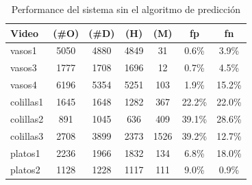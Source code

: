 \begin{table}[htb]
  \begin{tabular}{|l | c | c | c | c | c | c |}
	\hline  
	\textbf{Video} & \textbf{(\#O)} &  \textbf{(\#D)} & \textbf{(H)} & 
	\textbf{(M)} & \textbf{fp} & \textbf{fn}\\
	\hline
	\hline
	vasos1 & 5050 & 4880 & 4849 & 31 & 0.6\% & 3.9\% \\
	vasos3 & 1777 & 1708 & 1696 & 12 & 0.7\% & 4.5\% \\	
	vasos4 & 6196 & 5354 & 5251 & 103 & 1.9\% & 15.2\% \\
	\hline
	colillas1 & 1645 & 1648 & 1282 & 367 & 22.2\% & 22.0\% \\
	colillas2 & 891 & 1045 & 636 &  409 & 39.1\% & 28.6\% \\
	colillas3 & 2708 & 3899 & 2373 & 1526 & 39.2\% & 12.7\% \\
	\hline
	platos1 & 2236 & 1966 & 1832 & 134 & 6.8\% & 18.0\%\\
	platos2 & 1128 & 1228 & 1117 & 111& 9.0\% & 0.9\% \\
	\hline
	\end{tabular}
	\caption{\label{tab:result} Performance del sistema sin el algoritmo de predicción}
\end{table}

